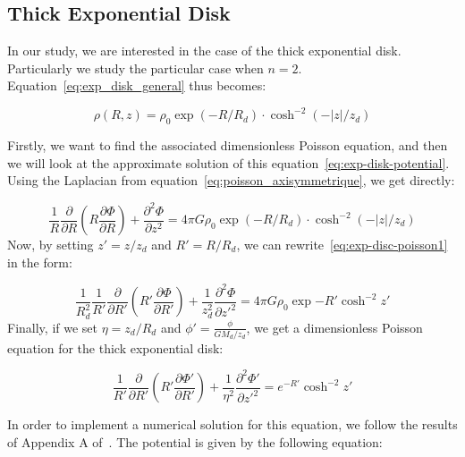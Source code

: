 \subsection{Thick Exponential Disk}

In our study, we are interested in the case of the thick exponential disk. Particularly we study the particular case when $n=2$. Equation~\eqref{eq:exp_disk_general} thus becomes:

\begin{equation}
    \label{eq:exp-disk}
    \rho(R, z) = \rho_0 \exp{\left(-R/R_d\right)}\cdot \cosh^{-2}{\left(-|z|/z_d\right)}
\end{equation}

Firstly, we want to find the associated dimensionless Poisson equation, and then we will look at the approximate solution of this equation~\eqref{eq:exp-disk-potential}. Using the Laplacian from equation~\eqref{eq:poisson_axisymmetrique}, we get directly:

\begin{equation}
\label{eq:exp-disc-poisson1}
\dfrac{1}{R} \dfrac{\partial}{\partial R} \left( R \dfrac{\partial \Phi}{\partial R}\right) + \dfrac{\partial^2 \Phi}{\partial z^2} = 4\pi G \rho_0 \exp{\left(-R/R_d\right)}\cdot \cosh^{-2}{\left(-|z|/z_d\right)}
\end{equation}
Now, by setting $z' = z/z_d$ and $R' = R/R_d$, we can rewrite~\eqref{eq:exp-disc-poisson1} in the form:

\begin{equation*}
\dfrac{1}{R_{d}^{2}} \dfrac{1}{R'} \dfrac{\partial}{\partial R'} \left(R' \dfrac{\partial \Phi}{\partial R'}\right) + \dfrac{1}{z_{d}^{2}}\dfrac{\partial^2 \Phi}{\partial z'^2} = 4\pi G \rho_0 \exp{-R'} \cosh^{-2}{z'}
\end{equation*}
Finally, if we set $\eta = z_d/R_d $ and $\phi'= \frac{\phi}{G M_d/z_d}$, we get a dimensionless Poisson equation for the thick exponential disk:

\begin{equation}
\label{eq:poisson-exp-disc-final}
\dfrac{1}{R'} \dfrac{\partial}{\partial R'} \left(R' \dfrac{\partial \Phi'}{\partial R'}\right) + \dfrac{1}{\eta^{2}}\dfrac{\partial^2 \Phi'}{\partial z'^2} = e^{-R'} \cosh^{-2}{z'}
\end{equation}

In order to implement a numerical solution for this equation, we follow the results of Appendix A of~\cite{bonetti2021dynamical}. The potential is given by the following equation:

